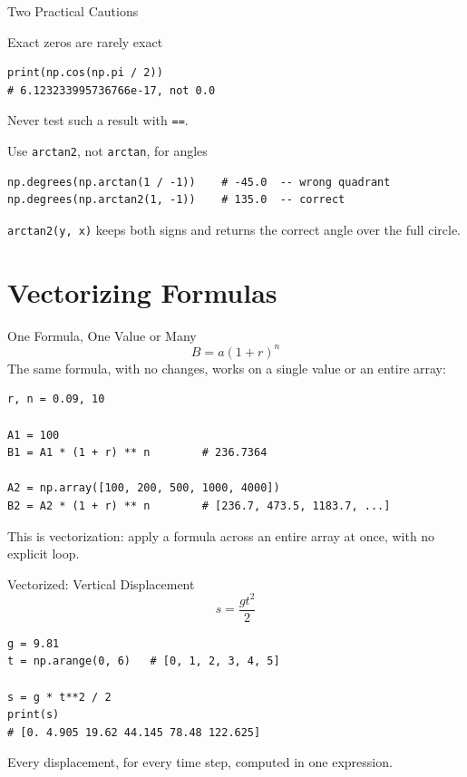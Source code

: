 \documentclass[9pt,aspectratio=169,xcolor=table]{beamer}
\begin{document}
\begin{frame}[fragile]{Two Practical Cautions}
    \leavevmode
    \begin{block}{Exact zeros are rarely exact}
\begin{lstlisting}
print(np.cos(np.pi / 2))
# 6.123233995736766e-17, not 0.0
\end{lstlisting}
        \small Never test such a result with \texttt{==}.
    \end{block}

    \vspace{2mm}
    \begin{block}{Use \texttt{arctan2}, not \texttt{arctan}, for angles}
\begin{lstlisting}
np.degrees(np.arctan(1 / -1))    # -45.0  -- wrong quadrant
np.degrees(np.arctan2(1, -1))    # 135.0  -- correct
\end{lstlisting}
        \small \texttt{arctan2(y, x)} keeps both signs and returns the
        correct angle over the full circle.
    \end{block}
\end{frame}

\section{Vectorizing Formulas}

\begin{frame}[fragile]{One Formula, One Value or Many}
    \leavevmode
    \[
    B = a(1+r)^n
    \]
    The same formula, with no changes, works on a single value or an
    entire array:

\begin{lstlisting}
r, n = 0.09, 10

A1 = 100
B1 = A1 * (1 + r) ** n        # 236.7364

A2 = np.array([100, 200, 500, 1000, 4000])
B2 = A2 * (1 + r) ** n        # [236.7, 473.5, 1183.7, ...]
\end{lstlisting}

    \vspace{1mm}
    {\small This is \alert{vectorization}: apply a formula across an
    entire array at once, with no explicit loop.}
\end{frame}

\begin{frame}[fragile]{Vectorized: Vertical Displacement}
    \leavevmode
    \[
    s = \frac{g t^2}{2}
    \]

\begin{lstlisting}
g = 9.81
t = np.arange(0, 6)   # [0, 1, 2, 3, 4, 5]

s = g * t**2 / 2
print(s)
# [0. 4.905 19.62 44.145 78.48 122.625]
\end{lstlisting}

    \vspace{2mm}
    {\small Every displacement, for every time step, computed in one
    expression.}
\end{frame}
\end{document}
